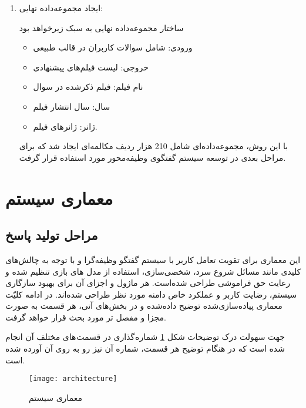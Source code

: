 \begin{enumerate}
\item
ایجاد مجموعه‌داده نهایی: 

ساختار مجموعه‌داده نهایی به سبک زیرخواهد بود
\begin{itemize}
\item
ورودی: شامل سوالات کاربران در قالب طبیعی
\item
خروجی: لیست فیلم‌های پیشنهادی
\item
نام فیلم: فیلم ذکر‌شده در سوال
\item
سال: سال انتشار فیلم
\item
ژانر: ژانرهای فیلم.

\end{itemize}

با این روش، مجموعه‌داده‌ای شامل 210 هزار ردیف مکالمه‌ای ایجاد شد که برای مراحل بعدی در توسعه سیستم گفتگوی وظیفه‌محور مورد استفاده قرار گرفت.


\end{enumerate}

\section{معماری سیستم}
\label{sec:architecture}
\subsection{مراحل تولید پاسخ}

این معماری برای تقویت تعامل کاربر با سیستم گفتگو وظیفه‌گرا و با  توجه به چالش‌های کلیدی مانند مسائل شروع سرد، شخصی‌سازی، استفاده از مدل های بازی تنظیم شده و رعایت حق فراموشی طراحی شده‌است. هر ماژول و اجزای آن برای بهبود سازگاری سیستم، رضایت کاربر و عملکرد خاص دامنه مورد نظر طراحی شده‌اند. در ادامه کلیّت معماری پیاده‌سازی‌شده توضیح داده‌شده و در بخش‌های آتی، هر قسمت به صورت مجزا و مفصل تر مورد بحث قرار خواهد گرفت.

جهت سهولت درک توضیحات شکل%
\ref{fig:architecture}
شماره گذاری در قسمت های مختلف آن انجام شده است که در هنگام توضیح هر قسمت، شماره آن نیز رو به روی آن آورده شده است.


\begin{figure}[ht]
	\centerline{\texttt{[image: architecture]}}
	\caption{معماری سیستم}
	\label{fig:architecture}
\end{figure}


